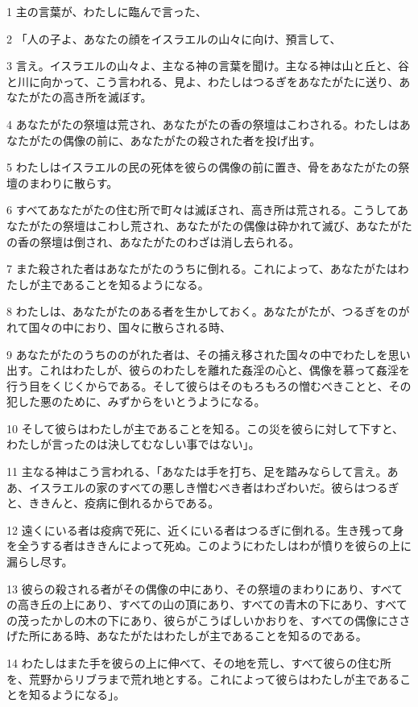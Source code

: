 \par 1 主の言葉が、わたしに臨んで言った、
\par 2 「人の子よ、あなたの顔をイスラエルの山々に向け、預言して、
\par 3 言え。イスラエルの山々よ、主なる神の言葉を聞け。主なる神は山と丘と、谷と川に向かって、こう言われる、見よ、わたしはつるぎをあなたがたに送り、あなたがたの高き所を滅ぼす。
\par 4 あなたがたの祭壇は荒され、あなたがたの香の祭壇はこわされる。わたしはあなたがたの偶像の前に、あなたがたの殺された者を投げ出す。
\par 5 わたしはイスラエルの民の死体を彼らの偶像の前に置き、骨をあなたがたの祭壇のまわりに散らす。
\par 6 すべてあなたがたの住む所で町々は滅ぼされ、高き所は荒される。こうしてあなたがたの祭壇はこわし荒され、あなたがたの偶像は砕かれて滅び、あなたがたの香の祭壇は倒され、あなたがたのわざは消し去られる。
\par 7 また殺された者はあなたがたのうちに倒れる。これによって、あなたがたはわたしが主であることを知るようになる。
\par 8 わたしは、あなたがたのある者を生かしておく。あなたがたが、つるぎをのがれて国々の中におり、国々に散らされる時、
\par 9 あなたがたのうちののがれた者は、その捕え移された国々の中でわたしを思い出す。これはわたしが、彼らのわたしを離れた姦淫の心と、偶像を慕って姦淫を行う目をくじくからである。そして彼らはそのもろもろの憎むべきことと、その犯した悪のために、みずからをいとうようになる。
\par 10 そして彼らはわたしが主であることを知る。この災を彼らに対して下すと、わたしが言ったのは決してむなしい事ではない」。
\par 11 主なる神はこう言われる、「あなたは手を打ち、足を踏みならして言え。ああ、イスラエルの家のすべての悪しき憎むべき者はわざわいだ。彼らはつるぎと、ききんと、疫病に倒れるからである。
\par 12 遠くにいる者は疫病で死に、近くにいる者はつるぎに倒れる。生き残って身を全うする者はききんによって死ぬ。このようにわたしはわが憤りを彼らの上に漏らし尽す。
\par 13 彼らの殺される者がその偶像の中にあり、その祭壇のまわりにあり、すべての高き丘の上にあり、すべての山の頂にあり、すべての青木の下にあり、すべての茂ったかしの木の下にあり、彼らがこうばしいかおりを、すべての偶像にささげた所にある時、あなたがたはわたしが主であることを知るのである。
\par 14 わたしはまた手を彼らの上に伸べて、その地を荒し、すべて彼らの住む所を、荒野からリブラまで荒れ地とする。これによって彼らはわたしが主であることを知るようになる」。

